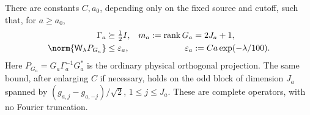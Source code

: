 \begin{proposition}
\label{prop:v135-growing-radical}
There are constants $C,a_0$, depending only on the fixed source and
cutoff, such that, for $a\ge a_0$,
\begin{align}
 \Gamma_a&\succeq\tfrac12 I,
       &m_a:=\operatorname{rank}G_a&=2J_a+1,\label{eq:v135-gram}\\
 \norm{\mathsf W_\lambda P_{G_a}}
       &\le\varepsilon_a,
       &\varepsilon_a&:=Ca\exp(-\lambda/100).
       \label{eq:v135-block-residual}
\end{align}
Here $P_{G_a}=G_a\Gamma_a^{-1}G_a^*$ is the ordinary physical
orthogonal projection.  The same bound, after enlarging $C$ if
necessary, holds on the odd block of dimension $J_a$ spanned by
$(g_{a,j}-g_{a,-j})/\sqrt2$, $1\le j\le J_a$.
These are complete operators, with no Fourier truncation.
\end{proposition}
